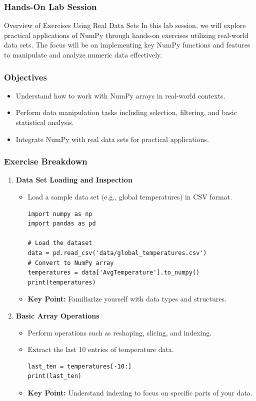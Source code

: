 \documentclass{beamer}
\begin{document}
\begin{frame}
    \frametitle{Hands-On Lab Session}
    \begin{block}{Overview of Exercises Using Real Data Sets}
        In this lab session, we will explore practical applications of NumPy through hands-on exercises utilizing real-world data sets. 
        The focus will be on implementing key NumPy functions and features to manipulate and analyze numeric data effectively.
    \end{block}
\end{frame}

\begin{frame}
    \frametitle{Objectives}
    \begin{itemize}
        \item Understand how to work with NumPy arrays in real-world contexts.
        \item Perform data manipulation tasks including selection, filtering, and basic statistical analysis.
        \item Integrate NumPy with real data sets for practical applications.
    \end{itemize}
\end{frame}

\begin{frame}[fragile]
    \frametitle{Exercise Breakdown}
    \begin{enumerate}
        \item \textbf{Data Set Loading and Inspection}
        \begin{itemize}
            \item Load a sample data set (e.g., global temperatures) in CSV format.
            \begin{lstlisting}
import numpy as np
import pandas as pd

# Load the dataset
data = pd.read_csv('data/global_temperatures.csv')
# Convert to NumPy array
temperatures = data['AvgTemperature'].to_numpy()
print(temperatures)
            \end{lstlisting}
            \item \textbf{Key Point:} Familiarize yourself with data types and structures.
        \end{itemize}
        
        \item \textbf{Basic Array Operations}
        \begin{itemize}
            \item Perform operations such as reshaping, slicing, and indexing.
            \item Extract the last 10 entries of temperature data.
            \begin{lstlisting}
last_ten = temperatures[-10:]
print(last_ten)
            \end{lstlisting}
            \item \textbf{Key Point:} Understand indexing to focus on specific parts of your data.
        \end{itemize}
    \end{enumerate}
\end{frame}
\end{document}
